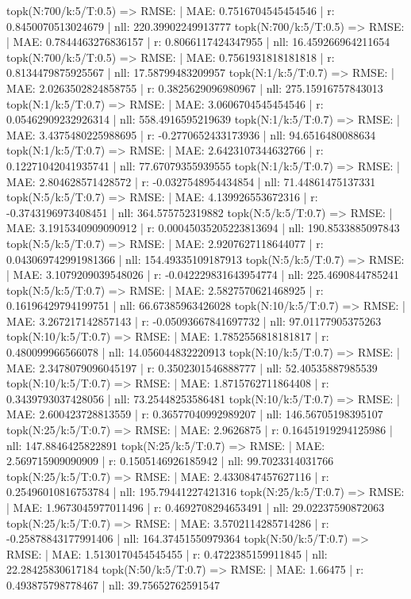 topk(N:700/k:5/T:0.5) => RMSE: | MAE: 0.7516704545454546 | r: 0.8450070513024679 | nll: 220.39902249913777
topk(N:700/k:5/T:0.5) => RMSE: | MAE: 0.7844463276836157 | r: 0.8066117424347955 | nll: 16.459266964211654
topk(N:700/k:5/T:0.5) => RMSE: | MAE: 0.7561931818181818 | r: 0.8134479875925567 | nll: 17.58799483209957
topk(N:1/k:5/T:0.7) => RMSE: | MAE: 2.0263502824858755 | r: 0.3825629096980967 | nll: 275.15916757843013
topk(N:1/k:5/T:0.7) => RMSE: | MAE: 3.0606704545454546 | r: 0.05462909232926314 | nll: 558.4916595219639
topk(N:1/k:5/T:0.7) => RMSE: | MAE: 3.4375480225988695 | r: -0.2770652433173936 | nll: 94.6516480088634
topk(N:1/k:5/T:0.7) => RMSE: | MAE: 2.6423107344632766 | r: 0.12271042041935741 | nll: 77.67079355939555
topk(N:1/k:5/T:0.7) => RMSE: | MAE: 2.804628571428572 | r: -0.0327548954434854 | nll: 71.44861475137331
topk(N:5/k:5/T:0.7) => RMSE: | MAE: 4.139926553672316 | r: -0.3743196973408451 | nll: 364.575752319882
topk(N:5/k:5/T:0.7) => RMSE: | MAE: 3.1915340909090912 | r: 0.00045035205223813694 | nll: 190.8533885097843
topk(N:5/k:5/T:0.7) => RMSE: | MAE: 2.9207627118644077 | r: 0.043069742991981366 | nll: 154.49335109187913
topk(N:5/k:5/T:0.7) => RMSE: | MAE: 3.1079209039548026 | r: -0.042229831643954774 | nll: 225.4690844785241
topk(N:5/k:5/T:0.7) => RMSE: | MAE: 2.5827570621468925 | r: 0.16196429794199751 | nll: 66.67385963426028
topk(N:10/k:5/T:0.7) => RMSE: | MAE: 3.267217142857143 | r: -0.05093667841697732 | nll: 97.01177905375263
topk(N:10/k:5/T:0.7) => RMSE: | MAE: 1.7852556818181817 | r: 0.480099966566078 | nll: 14.056044832220913
topk(N:10/k:5/T:0.7) => RMSE: | MAE: 2.3478079096045197 | r: 0.3502301546888777 | nll: 52.40535887985539
topk(N:10/k:5/T:0.7) => RMSE: | MAE: 1.8715762711864408 | r: 0.3439793037428056 | nll: 73.25448253586481
topk(N:10/k:5/T:0.7) => RMSE: | MAE: 2.600423728813559 | r: 0.36577040992989207 | nll: 146.56705198395107
topk(N:25/k:5/T:0.7) => RMSE: | MAE: 2.9626875 | r: 0.16451919294125986 | nll: 147.8846425822891
topk(N:25/k:5/T:0.7) => RMSE: | MAE: 2.569715909090909 | r: 0.1505146926185942 | nll: 99.7023314031766
topk(N:25/k:5/T:0.7) => RMSE: | MAE: 2.4330847457627116 | r: 0.25496010816753784 | nll: 195.79441227421316
topk(N:25/k:5/T:0.7) => RMSE: | MAE: 1.9673045977011496 | r: 0.4692708294653491 | nll: 29.02237590872063
topk(N:25/k:5/T:0.7) => RMSE: | MAE: 3.5702114285714286 | r: -0.25878843177991406 | nll: 164.37451550979364
topk(N:50/k:5/T:0.7) => RMSE: | MAE: 1.5130170454545455 | r: 0.4722385159911845 | nll: 22.28425830617184
topk(N:50/k:5/T:0.7) => RMSE: | MAE: 1.66475 | r: 0.493875798778467 | nll: 39.75652762591547
